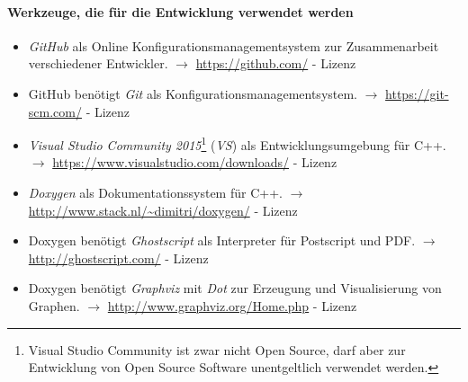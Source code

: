 \documentclass[english,ngerman,parskip=half,headsepline,footsepline]{scrreprt}
\newcounter{Enumi}
\begin{document}
	\paragraph{Werkzeuge, die für die Entwicklung verwendet werden}
	\begin{itemize}
		\setcounter{enumi}{\value{Enumi}}
		
		\item\label{Werkzeug:GitHub}\emph{GitHub} als Online Konfigurationsmanagementsystem zur Zusammenarbeit verschiedener Entwickler. $\rightarrow$ \url{https://github.com/} - Lizenz \cite{bib:GPLii}
		
		\item\label{Werkzeug:Git}GitHub benötigt \emph{Git} als Konfigurationsmanagementsystem. $\rightarrow$ \url{https://git-scm.com/} - Lizenz \cite{bib:GPLii}
		
		\item\label{Werkzeug:VSC}\emph{Visual Studio Community 2015}\footnote{ Visual Studio Community ist zwar nicht Open Source, darf aber zur Entwicklung von Open Source Software unentgeltlich verwendet werden.} (\emph{VS}) als Entwicklungsumgebung für C++. $\rightarrow$ \url{https://www.visualstudio.com/downloads/} - Lizenz \cite{bib:EULA}
		
		\item\label{Werkzeug:Doxygen}\emph{Doxygen} als Dokumentationssystem für C++. $\rightarrow$ \url{http://www.stack.nl/~dimitri/doxygen/} - Lizenz \cite{bib:GPLii}
		
		\item\label{Werkzeug:Ghostscript}Doxygen benötigt \emph{Ghostscript} als Interpreter für Postscript und PDF. $\rightarrow$ \url{http://ghostscript.com/} - Lizenz \cite{bib:AGPL}
		
		\item\label{Werkzeug:Graphviz}Doxygen benötigt \emph{Graphviz} mit \emph{Dot} zur Erzeugung und Visualisierung von Graphen. $\rightarrow$ \url{http://www.graphviz.org/Home.php} - Lizenz \cite{bib:EPL}
		
		\setcounter{Enumi}{\value{enumi}}
	\end{itemize}
	
\end{document}
